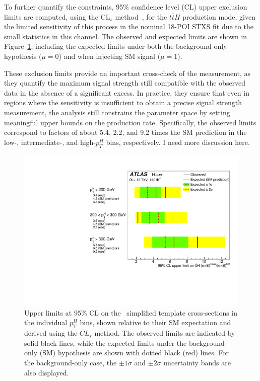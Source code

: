 To further quantify the constraints, 95\% confidence level (CL) upper exclusion limits are computed, using the $\text{CL}_{s}$ method~\cite{JUNK1999435,ALRead_2002}, for the $t\bar{t}H$ production mode, given the limited sensitivity of this process in the nominal 18-POI STXS fit due to the small statistics in this channel. The observed and expected limits are shown in Figure~\ref{fig:tth_cls_limits}, including the expected limits under both the background-only hypothesis ($\mu=0$) and when injecting SM signal ($\mu=1$). 

These exclusion limits provide an important cross-check of the measurement, as they quantify the maximum signal strength still compatible with the observed data in the absence of a significant excess. In practice, they ensure that even in regions where the sensitivity is insufficient to obtain a precise signal strength measurement, the analysis still constrains the parameter space by setting meaningful upper bounds on the production rate. Specifically, the observed limits correspond to factors of about 5.4, 2.2, and 9.2 times the SM prediction in the low-, intermediate-, and high-$p_{T}^{H}$ bins, respectively. I need more discussion here.

\begin{figure}[htbp]
  \centering
  \includegraphics[width=0.70\linewidth]{images/fit_stxs/fig_08.pdf} %
  \caption{Upper limits at 95\% CL on the \ttH\ simplified template cross-sections in the individual $p_{\mathrm{T}}^{H}$ bins, shown relative to their SM expectation and derived using the $CL_s$ method. The observed limits are indicated by solid black lines, while the expected limits under the background-only (SM) hypothesis are shown with dotted black (red) lines. For the background-only case, the $\pm 1\sigma$ and $\pm 2\sigma$ uncertainty bands are also displayed.}
  \label{fig:tth_cls_limits}
\end{figure}









